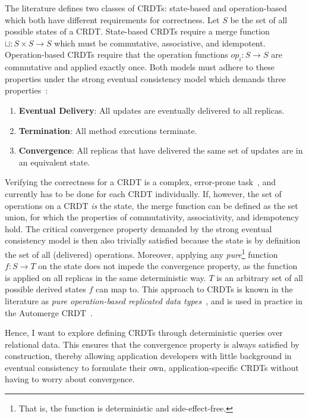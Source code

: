 The literature defines two classes of CRDTs: state-based and operation-based
which both have different requirements for correctness.
Let \( S \) be the set of all possible states of a CRDT.
State-based CRDTs require a merge function \( \sqcup: S \times S \to S \)
which must be commutative, associative, and idempotent.
Operation-based CRDTs require that the operation functions \( op_i: S \to S \)
are commutative and applied exactly once.
Both models must adhere to these properties under the strong eventual consistency
model which demands three properties~\cite{shapiro2011comprehensive}:

\begin{enumerate}
	\item \textbf{Eventual Delivery}: All updates are eventually delivered to
	      all replicas.
	\item \textbf{Termination}: All method executions terminate.
	\item \textbf{Convergence}: All replicas that have delivered the same set of
	      updates are in an equivalent state.
\end{enumerate}

Verifying the correctness for a CRDT is a complex,
error-prone task~\cite{gomes2017verifying, kleppmann2022assessing},
and currently has to be done for each CRDT individually.
If, however, the set of operations on a CRDT \emph{is} the state,
the merge function can be defined as the set union,
for which the properties of commutativity, associativity, and idempotency hold.
The critical convergence property demanded by the strong eventual consistency
model is then also trivially satisfied because the state is by definition
the set of all (delivered) operations.
Moreover, applying any \emph{pure}\footnote{
	That is, the function is deterministic and side-effect-free.
}
function \( f: S \to T \) on the state does not impede the convergence property,
as the function is applied on all replicas in the same deterministic way.
\( T \) is an arbitrary set of all possible derived states \( f \) can map to.
This approach to \acp{CRDT} is known in the literature as
\emph{pure operation-based replicated data types}~\cite{baquero2017pure, stewen2024undo},
and is used in practice in the Automerge CRDT~\cite{automerge}.


Hence, I want to explore defining CRDTs through deterministic queries over
relational data.
This ensures that the convergence property is always satisfied by construction,
thereby allowing application developers with little background in eventual
consistency to formulate their own, application-specific \acp{CRDT} without
having to worry about convergence.

